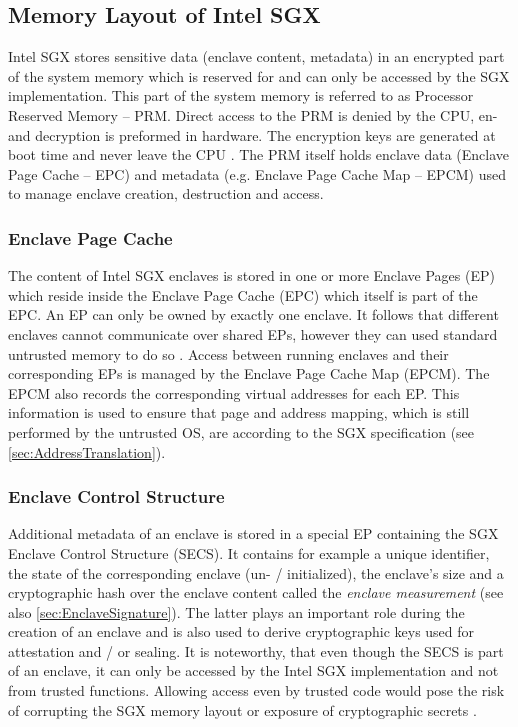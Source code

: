 \subsection{Memory Layout of Intel SGX}
Intel SGX stores sensitive data (enclave content, metadata) in an encrypted part of the system memory which is reserved for and can only be accessed by the SGX 
implementation. This part of the system memory is referred to as Processor Reserved Memory -- PRM. Direct access to the PRM is denied by the CPU, en- and decryption 
is preformed in hardware. The encryption keys are generated at boot time and never leave the CPU \cite{IntelSGXExplanation}. The PRM itself holds enclave data (Enclave 
Page Cache -- EPC) and metadata (e.g. Enclave Page Cache Map -- EPCM) used to manage enclave creation, destruction and access.

\subsubsection{Enclave Page Cache}
The content of Intel SGX enclaves is stored in one or more Enclave Pages (EP) which reside inside the Enclave Page Cache (EPC) which itself is part of the EPC. An EP
can only be owned by exactly one enclave. It follows that different enclaves cannot communicate over shared EPs, however they can used standard untrusted memory to
do so \cite{Costan2016IntelSE}. Access between running enclaves and their corresponding EPs is managed by the Enclave Page Cache Map (EPCM). The EPCM also records
the corresponding virtual addresses for each EP. This information is used to ensure that page and address mapping, which is still performed by the untrusted OS, 
are according to the SGX specification (see \cref{sec:AddressTranslation}). 

\subsubsection{Enclave Control Structure}
Additional metadata of an enclave is stored in a special EP containing the SGX Enclave Control Structure (SECS). It contains for example a unique identifier, the
state of the corresponding enclave (un- / initialized), the enclave's size and a cryptographic hash over the enclave content called the \textit{enclave measurement} (see
also \cref{sec:EnclaveSignature}). The latter plays an important role during the creation of an enclave and is also used to derive cryptographic keys used for attestation 
and / or sealing. It is noteworthy, that even though the SECS is part of an enclave, it can only be accessed by the Intel SGX implementation and not from trusted functions. 
Allowing access even by trusted code would pose the risk of corrupting the SGX memory layout or exposure of cryptographic secrets \cite{Costan2016IntelSE}.

